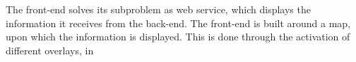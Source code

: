 
The front-end solves its subproblem as web service, which displays the information it receives from the back-end. The front-end is built around a map, upon which the information is displayed. This is done through the activation of different overlays, in





